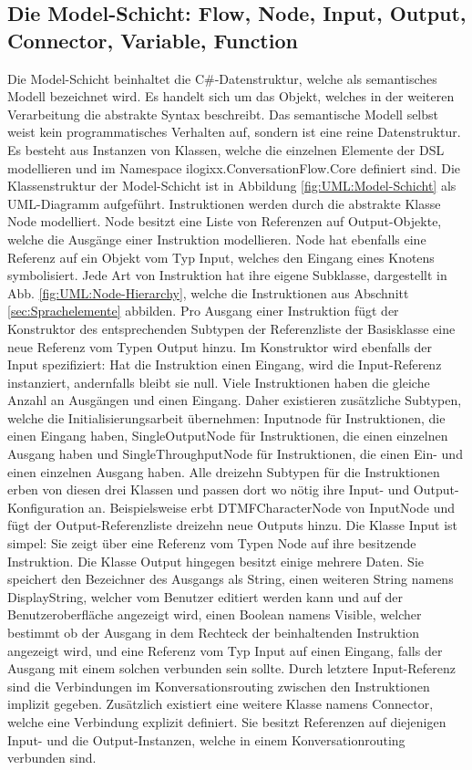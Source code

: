 \subsection[Die Model-Schicht]{Die Model-Schicht: Flow, Node, Input, Output, Connector, Variable, Function}
\label{subsec:Die Model-Schicht}
Die Model-Schicht beinhaltet die C\#-Datenstruktur, welche als semantisches Modell bezeichnet wird. Es handelt sich um das Objekt, welches in der weiteren Verarbeitung die abstrakte Syntax beschreibt. Das semantische Modell selbst weist kein programmatisches Verhalten auf, sondern ist eine reine Datenstruktur. Es besteht aus Instanzen von Klassen, welche die einzelnen Elemente der DSL modellieren und im Namespace ilogixx.ConversationFlow.Core definiert sind. Die Klassenstruktur der Model-Schicht ist in Abbildung \ref{fig:UML:Model-Schicht} als UML-Diagramm aufgeführt.
\newline
Instruktionen werden durch die abstrakte Klasse Node modelliert. Node besitzt eine Liste von Referenzen auf Output-Objekte, welche die Ausgänge einer Instruktion modellieren. Node hat ebenfalls eine Referenz auf ein Objekt vom Typ Input, welches den Eingang eines Knotens symbolisiert. Jede Art von Instruktion hat ihre eigene Subklasse, dargestellt in Abb. \ref{fig:UML:Node-Hierarchy}, welche die Instruktionen aus Abschnitt \ref{sec:Sprachelemente} abbilden. Pro Ausgang einer Instruktion fügt der Konstruktor des entsprechenden Subtypen der Referenzliste der Basisklasse eine neue Referenz vom Typen Output hinzu. Im Konstruktor wird ebenfalls der Input spezifiziert: Hat die Instruktion einen Eingang, wird die Input-Referenz instanziert, andernfalls bleibt sie null. Viele Instruktionen haben die gleiche Anzahl an Ausgängen und einen Eingang. Daher existieren zusätzliche Subtypen, welche die Initialisierungsarbeit übernehmen: Inputnode für Instruktionen, die einen Eingang haben, SingleOutputNode für Instruktionen, die einen einzelnen Ausgang haben und SingleThroughputNode für Instruktionen, die einen Ein- und einen einzelnen Ausgang haben. Alle dreizehn Subtypen für die Instruktionen erben von diesen drei Klassen und passen dort wo nötig ihre Input- und Output-Konfiguration an. Beispielsweise erbt DTMFCharacterNode von InputNode und fügt der Output-Referenzliste dreizehn neue Outputs hinzu.
\newline
Die Klasse Input ist simpel: Sie zeigt über eine Referenz vom Typen Node auf ihre besitzende Instruktion. Die Klasse Output hingegen besitzt einige mehrere Daten. Sie speichert den Bezeichner des Ausgangs als String, einen weiteren String namens DisplayString, welcher vom Benutzer editiert werden kann und auf der Benutzeroberfläche angezeigt wird, einen Boolean namens Visible, welcher bestimmt ob der Ausgang in dem Rechteck der beinhaltenden Instruktion angezeigt wird, und eine Referenz vom Typ Input auf einen Eingang, falls der Ausgang mit einem solchen verbunden sein sollte. Durch letztere Input-Referenz sind die Verbindungen im Konversationsrouting zwischen den Instruktionen implizit gegeben. Zusätzlich existiert eine weitere Klasse namens Connector, welche eine Verbindung explizit definiert. Sie besitzt Referenzen auf diejenigen Input- und die Output-Instanzen, welche in einem Konversationrouting verbunden sind.
